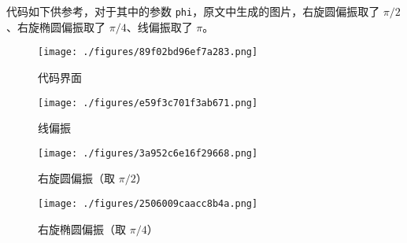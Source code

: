 

\begin{issues}
\issueDraft
\end{issues}

代码如下供参考，对于其中的参数 \verb`phi`，原文中生成的图片，右旋圆偏振取了 $\pi/2$、右旋椭圆偏振取了 $\pi/4$、线偏振取了 $\pi$。

\begin{figure}[ht]
\centering
\texttt{[image: ./figures/89f02bd96ef7a283.png]}
\caption{代码界面} \label{fig_PLCode_1}
\end{figure}

\begin{figure}[ht]
\centering
\texttt{[image: ./figures/e59f3c701f3ab671.png]}
\caption{线偏振} \label{fig_PLCode_2}
\end{figure}

\begin{figure}[ht]
\centering
\texttt{[image: ./figures/3a952c6e16f29668.png]}
\caption{右旋圆偏振（取 $\pi/2$）} \label{fig_PLCode_3}
\end{figure}

\begin{figure}[ht]
\centering
\texttt{[image: ./figures/2506009caacc8b4a.png]}
\caption{右旋椭圆偏振（取 $\pi/4$）} \label{fig_PLCode_4}
\end{figure}


